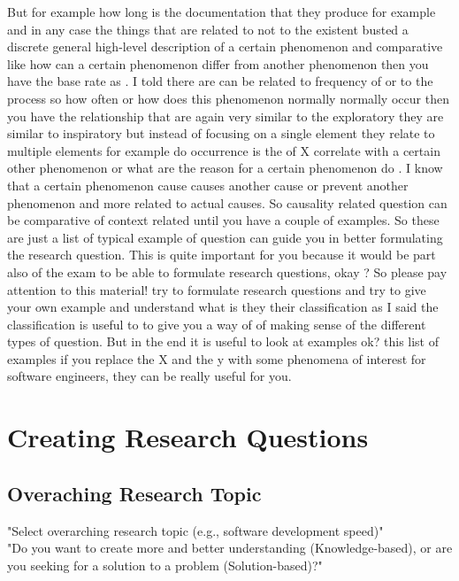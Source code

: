 \documentclass[conference, compsoc, twoside]{IEEEtran}
\begin{document}
But for example how long is the documentation that they produce for example and in any case the things that are related to not to the existent busted a discrete general high-level description of a certain phenomenon and comparative like how can a certain phenomenon differ from another phenomenon then you have the base rate as .
I told there are can be related to frequency of or to the process so how often or how does this phenomenon normally normally occur then you have the relationship that are again very similar to the exploratory they are similar to inspiratory but instead of focusing on a single element they relate to multiple elements for example do occurrence is the of X correlate with a certain other phenomenon or what are the reason for a certain phenomenon do .
I know that a certain phenomenon cause causes another cause or prevent another phenomenon and more related to actual causes.
So causality related question can be comparative of context related until you have a couple of examples. 
So these are just a list of typical example of question can guide you in better formulating the research question.
This is quite important for you because it would be part also of the exam to be able to formulate research questions, okay ? 
So please pay attention to this material! try to formulate research questions and try to give your own example and 
understand what is they their classification as I said the classification is useful to to give you a way of of making sense of the different types of question. 
But in the end it is useful to look at examples ok? this list of examples if you replace the X and the y with some phenomena of interest for software engineers, they can be really useful for you.


\section{Creating Research Questions} %
\subsection{Overaching Research Topic} %
\label{sub:overaching_research_topic}
"Select overarching research topic (e.g., software development speed)"\\	
"Do you want to create more and better understanding (Knowledge-based), or are you seeking for a solution to a problem (Solution-based)?"\\
\end{document}
